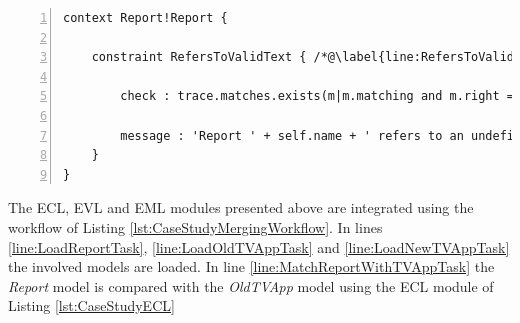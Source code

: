 \begin{lstlisting}[basicstyle=\ttfamily\footnotesize, flexiblecolumns=true, numbers=left, nolol=true, caption=EVL module that validates a Report model against a TVApp model, label=lst:ValidateReport, language=EVL, tabsize=2]
context Report!Report {
	
	constraint RefersToValidText { /*@\label{line:RefersToValidText}@*/
		
		check : trace.matches.exists(m|m.matching and m.right = self)
		
		message : 'Report ' + self.name + ' refers to an undefined text'	
	}
}
\end{lstlisting}

The ECL, EVL and EML modules presented above are integrated using the workflow of Listing \ref{lst:CaseStudyMergingWorkflow}. In lines \ref{line:LoadReportTask}, \ref{line:LoadOldTVAppTask} and \ref{line:LoadNewTVAppTask} the involved models are loaded. In line 
\ref{line:MatchReportWithTVAppTask} the \emph{Report} model is compared with the \emph{OldTVApp} model using the ECL module of Listing \ref{lst:CaseStudyECL}

